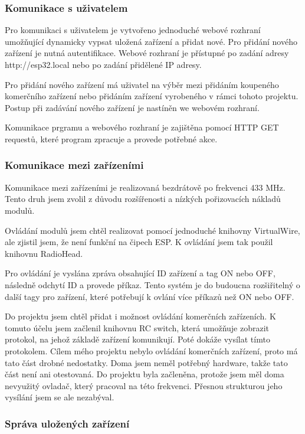 \documentclass[a4paper,titlepage]{article}
\begin{document}
{\subsubsection{Komunikace s uživatelem}

Pro komunikaci s uživatelem je vytvořeno jednoduché webové rozhraní umožňující dynamicky vypsat uložená zařízení a přidat nové. Pro přidání nového zařízení je nutná autentifikace. Webové rozhraní je přístupné po zadání adresy http://esp32.local nebo po zadání přidělené IP adresy.


Pro přidání nového zařízení má uživatel na výběr mezi přidáním koupeného komerčního zařízení nebo přidáním zařízení vyrobeného v rámci tohoto projektu. Postup při zadávání nového zařízení je nastíněn we webovém rozhraní.


Komunikace prgramu a webového rozhraní je zajištěna pomocí HTTP GET requestů, které program zpracuje a provede potřebné akce. 

\subsubsection{Komunikace mezi zařízeními}

Komunikace mezi zařízeními je realizovaná bezdrátově po frekvenci 433 MHz. Tento druh jsem zvolil z důvodu rozšířenosti a nízkých pořizovacích nákladů modulů.


Ovládání modulů jsem chtěl realizovat pomocí jednoduché knihovny VirtualWire, ale zjistil jsem, že není funkční na čipech ESP. K ovládání jsem tak použil knihovnu RadioHead. 


Pro ovládání  je vyslána zpráva obsahující ID zařízení a tag ON nebo OFF,  následně odchytí ID a provede příkaz. Tento systém je do budoucna rozšiřitelný o další tagy pro zařízení, které potřebují k ovlání více příkazů než ON nebo OFF.


Do projektu jsem chtěl přidat i možnost ovládání komerčních zařízeních. K tomuto účelu jsem začlenil knihovnu RC switch, která umožňuje zobrazit protokol, na jehož základě zařízení komunikují. Poté dokáže vysílat tímto protokolem. Cílem mého projektu nebylo ovládání komerčních zařízení, proto má tato část drobné nedostatky. Doma jsem neměl potřebný hardware, takže tato část není ani otestovaná. Do projektu byla začleněna, protože jsem měl doma nevyužitý ovladač, který pracoval na této frekvenci. Přesnou strukturou jeho vysílání jsem se ale nezabýval.

\subsubsection{Správa uložených zařízení}

}
\end{document}
